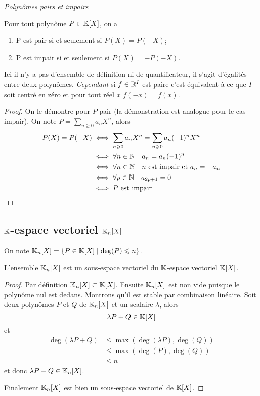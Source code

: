 \emph{Polynômes pairs et impairs}

\begin{prop}
  Pour tout polynôme \(P \in \mathbb{K}[X]\), on a
  \begin{enumerate}
    \item P est pair si et seulement si \(P(X) = P(-X)\);
    \item P est impair si et seulement si \(P(X) = -P(-X)\).
  \end{enumerate}
\end{prop}

\danger Ici il n'y a pas d'ensemble de définition ni de quantificateur, il
s'agit d'égalités entre deux polynômes. \emph{Cependant} si \(f \in \mathbb{R}^I\) est
paire c'est équivalent à ce que \(I\) soit centré en zéro et pour tout réel
\(x\) \(f(-x) = f(x)\).

\begin{proof}
  On le démontre pour \(P\) pair (la démonstration est analogue pour le cas
  impair). On note \(P = \sum_{n\geqslant 0} a_n X^n\), alors
  \begin{align}
    P(X) = P(-X) &\iff \sum_{n \geqslant 0} a_n X^n = \sum_{n \geqslant 0} a_n
    (-1)^n X^n\\
    &\iff \forall n \in \mathbb{N} \quad a_n = a_n(-1)^n\\
    &\iff \forall n \in \mathbb{N} \quad n \text{~est impair et~} a_n = -a_n\\
    &\iff \forall p \in \mathbb{N} \quad a_{2p+1} = 0\\
    &\iff P \text{~est impair}
  \end{align}
\end{proof}

\subsection{\(\mathbb{K}\)-espace vectoriel \(\mathbb{K}_n[X]\)}

On note \(\mathbb{K}_n[X] = \left\{P \in \mathbb{K}[X]\mathrel{}\middle|\mathrel{}\deg(P) \leqslant n\right\}\).

\begin{prop}
  L'ensemble \(\mathbb{K}_n[X]\) est un sous-espace vectoriel du \(\mathbb{K}\)-espace vectoriel
  \(\mathbb{K}[X]\).
\end{prop}
\begin{proof}
  Par définition \(\mathbb{K}_n[X] \subset \mathbb{K}[X]\). Ensuite \(\mathbb{K}_n[X]\) est non vide
  puisque le polynôme nul est dedans. Montrons qu'il est stable par combinaison
  linéaire. Soit deux polynômes \(P\) et \(Q\) de \(\mathbb{K}_n[X]\) et un scalaire
  \(\lambda\), alors
  \begin{equation}
    \lambda P +Q \in \mathbb{K}[X]
  \end{equation}
  et
  \begin{align}
    \deg(\lambda P+Q) &\leqslant \max(\deg(\lambda P),\deg(Q))\\
    &\leqslant \max(\deg(P),\deg(Q))\\
    &\leqslant n
  \end{align}
  et donc \(\lambda P +Q \in \mathbb{K}_n[X]\).

Finalement \(\mathbb{K}_n[X]\) est bien un sous-espace vectoriel de \(\mathbb{K}[X]\).
\end{proof}


